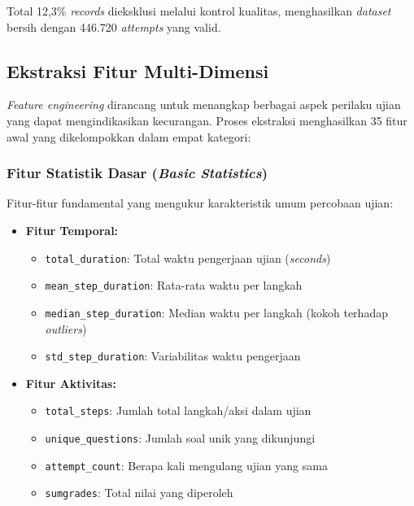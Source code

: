 Total 12,3\% \textit{records} dieksklusi melalui kontrol kualitas, menghasilkan \textit{dataset} bersih dengan 446.720 \textit{attempts} yang valid.

\subsection{Ekstraksi Fitur Multi-Dimensi}
\label{sec:ekstraksiFiturMultiDimensi}

\textit{Feature engineering} dirancang untuk menangkap berbagai aspek perilaku ujian yang dapat mengindikasikan kecurangan. Proses ekstraksi menghasilkan 35 fitur awal yang dikelompokkan dalam empat kategori:

\subsubsection{Fitur Statistik Dasar (\textit{Basic Statistics})}
\label{sec:fiturStatistikDasar}

Fitur-fitur fundamental yang mengukur karakteristik umum percobaan ujian:

\begin{itemize}
    \item \textbf{Fitur Temporal:}
    \begin{itemize}
        \item \texttt{total\_duration}: Total waktu pengerjaan ujian (\textit{seconds})
        \item \texttt{mean\_step\_duration}: Rata-rata waktu per langkah
        \item \texttt{median\_step\_duration}: Median waktu per langkah (kokoh terhadap \textit{outliers})
        \item \texttt{std\_step\_duration}: Variabilitas waktu pengerjaan
    \end{itemize}
    
    \item \textbf{Fitur Aktivitas:}
    \begin{itemize}
        \item \texttt{total\_steps}: Jumlah total langkah/aksi dalam ujian
        \item \texttt{unique\_questions}: Jumlah soal unik yang dikunjungi
        \item \texttt{attempt\_count}: Berapa kali mengulang ujian yang sama
        \item \texttt{sumgrades}: Total nilai yang diperoleh
    \end{itemize}
\end{itemize}

